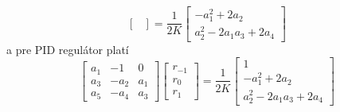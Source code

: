 \documentclass[a4paper, 10pt, ]{article}
\begin{document}
\begin{itemize}[leftmargin=0pt, labelsep=3mm, itemsep=0pt]
\begin{equation}
\begin{bmatrix}
        \end{bmatrix}
        =
        \frac{1}{2K}
        \begin{bmatrix}
            -a_1^2 + 2 a_2 \\ a_2^2 - 2 a_1a_3 + 2a_4
        \end{bmatrix}
    \end{equation}
    a pre PID regulátor platí
    \begin{equation}
        \begin{bmatrix}
            a_1 & -1 & 0 \\ a_3 & -a_2 & a_1 \\ a_5 & -a_4 & a_3
        \end{bmatrix}
        \begin{bmatrix}
            r_{-1} \\ r_0 \\ r_1
        \end{bmatrix}
        =
        \frac{1}{2K}
        \begin{bmatrix}
            1 \\ -a_1^2 + 2 a_2 \\ a_2^2 - 2 a_1a_3 + 2a_4
        \end{bmatrix}
    \end{equation}
\end{itemize}
\end{document}
